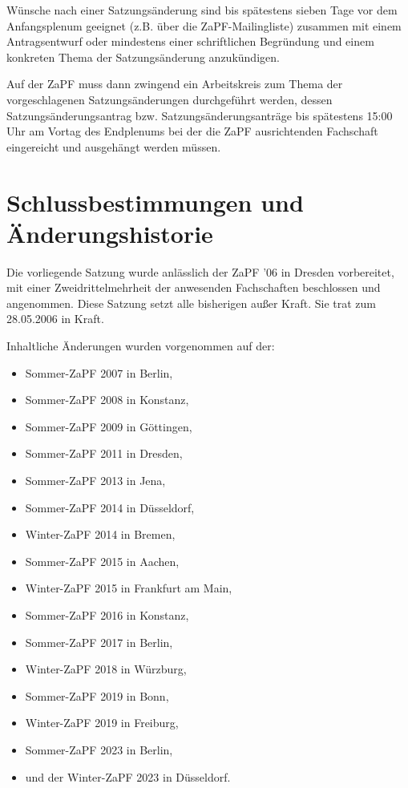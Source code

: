 \documentclass[
  a4paper,
  oneside]{scrartcl}
\providecommand{\tightlist}{%
  \setlength{\itemsep}{0pt}\setlength{\parskip}{0pt}}
\begin{document}
Wünsche nach einer Satzungsänderung sind bis spätestens sieben Tage vor
dem Anfangsplenum geeignet (z.B. über die ZaPF-Mailingliste) zusammen
mit einem Antragsentwurf oder mindestens einer schriftlichen Begründung
und einem konkreten Thema der Satzungsänderung anzukündigen.

Auf der ZaPF muss dann zwingend ein Arbeitskreis zum Thema der
vorgeschlagenen Satzungsänderungen durchgeführt werden, dessen
Satzungsänderungsantrag bzw. Satzungsänderungsanträge bis spätestens
15:00 Uhr am Vortag des Endplenums bei der die ZaPF ausrichtenden
Fachschaft eingereicht und ausgehängt werden müssen.

\hypertarget{schlussbestimmungen-und-uxe4nderungshistorie}{%
\section*{Schlussbestimmungen und
Änderungshistorie}\label{schlussbestimmungen-und-uxe4nderungshistorie}}

Die vorliegende Satzung wurde anlässlich der ZaPF '06 in Dresden
vorbereitet, mit einer Zweidrittelmehrheit der anwesenden Fachschaften
beschlossen und angenommen. Diese Satzung setzt alle bisherigen außer
Kraft. Sie trat zum 28.05.2006 in Kraft.

Inhaltliche Änderungen wurden vorgenommen auf der:

\begin{itemize}
\tightlist
\item
  Sommer-ZaPF 2007 in Berlin,
\item
  Sommer-ZaPF 2008 in Konstanz,
\item
  Sommer-ZaPF 2009 in Göttingen,
\item
  Sommer-ZaPF 2011 in Dresden,
\item
  Sommer-ZaPF 2013 in Jena,
\item
  Sommer-ZaPF 2014 in Düsseldorf,
\item
  Winter-ZaPF 2014 in Bremen,
\item
  Sommer-ZaPF 2015 in Aachen,
\item
  Winter-ZaPF 2015 in Frankfurt am Main,
\item
  Sommer-ZaPF 2016 in Konstanz,
\item
  Sommer-ZaPF 2017 in Berlin,
\item
  Winter-ZaPF 2018 in Würzburg,
\item
  Sommer-ZaPF 2019 in Bonn,
\item
  Winter-ZaPF 2019 in Freiburg,
\item
  Sommer-ZaPF 2023 in Berlin,
\item
  und der Winter-ZaPF 2023 in Düsseldorf.
\end{itemize}
\end{document}
